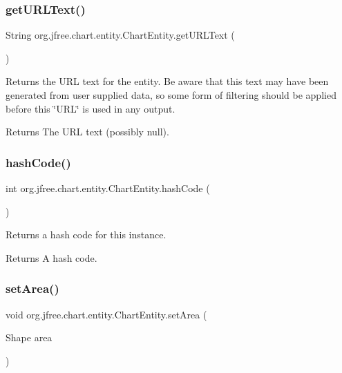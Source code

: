\subsubsection{\texorpdfstring{get\+U\+R\+L\+Text()}{getURLText()}}
{\footnotesize\ttfamily String org.\+jfree.\+chart.\+entity.\+Chart\+Entity.\+get\+U\+R\+L\+Text (\begin{DoxyParamCaption}{ }\end{DoxyParamCaption})}

Returns the U\+RL text for the entity. Be aware that this text may have been generated from user supplied data, so some form of filtering should be applied before this \char`\"{}\+U\+R\+L\char`\"{} is used in any output.

\begin{DoxyReturn}{Returns}
The U\+RL text (possibly {\ttfamily null}). 
\end{DoxyReturn}
\mbox{\label{classorg_1_1jfree_1_1chart_1_1entity_1_1_chart_entity_a8250dabed01efc94567afb592beb75dc}} 
\subsubsection{\texorpdfstring{hash\+Code()}{hashCode()}}
{\footnotesize\ttfamily int org.\+jfree.\+chart.\+entity.\+Chart\+Entity.\+hash\+Code (\begin{DoxyParamCaption}{ }\end{DoxyParamCaption})}

Returns a hash code for this instance.

\begin{DoxyReturn}{Returns}
A hash code. 
\end{DoxyReturn}
\mbox{\label{classorg_1_1jfree_1_1chart_1_1entity_1_1_chart_entity_addb49c1874de29e883d023334d443f1f}} 
\subsubsection{\texorpdfstring{set\+Area()}{setArea()}}
{\footnotesize\ttfamily void org.\+jfree.\+chart.\+entity.\+Chart\+Entity.\+set\+Area (\begin{DoxyParamCaption}\item[{Shape}]{area }\end{DoxyParamCaption})}

